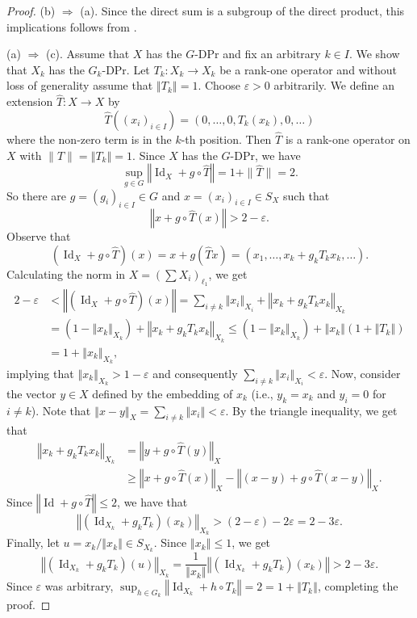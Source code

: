 \documentclass[a4paper,12pt]{amsart}
\theoremstyle{definition}
\theoremstyle{definition}
\theoremstyle{remark}
\numberwithin{equation}{section}
\DeclareMathOperator{\id}{Id}
\renewcommand{\geq}{\geqslant}
\renewcommand{\leq}{\leqslant}
\newcommand{\<}{\langle}
\renewcommand{\>}{\rangle}
\newcommand{\norm}[1]{\left\Vert#1\right\Vert}
\newcommand{\e}{\varepsilon}
\newcommand{\eps}{\e}
\begin{document}
	\begin{proof} (b) $\Rightarrow$ (a). Since the direct sum is a subgroup of the direct product, this implications follows from .  
		
		\noindent
		(a) $\Rightarrow$ (c). Assume that $X$ has the $G$-DPr and fix an arbitrary $k \in I$. We show that $X_k$ has the $G_k$-DPr. Let $T_k: X_k \to X_k$ be a rank-one operator and without loss of generality assume that $\norm{T_k} = 1$. Choose $\eps > 0$ arbitrarily. We define an extension $\hat{T}: X \to X$ by
		\[
		\hat{T}((x_i)_{i \in I}) = (0, \dots, 0, T_k(x_k), 0, \dots)
		\]
		where the non-zero term is in the $k$-th position. Then $\hat{T}$ is a rank-one operator on $X$ with $\|\hat{T}\| = \norm{T_k} = 1$. Since $X$ has the $G$-DPr, we have
		\[
		\sup_{g \in G} \norm{\id_X + g \circ \hat{T}} = 1 + \|\hat{T}\| = 2.
		\]
		So there are $g = (g_i)_{i \in I} \in G$ and $x = (x_i)_{i \in I} \in S_X$ such that
		\begin{equation*}
			\norm{x + g \circ \hat{T}(x)} > 2 - \eps.
		\end{equation*}
		Observe that
		\[
		(\id_X + g \circ \hat{T})(x) = x + g(\hat{T}x) = (x_1, \dots, x_k + g_k T_k x_k, \dots).
		\]
		Calculating the norm in $X = (\sum X_i)_{\ell_1}$, we get
		\begin{align*}
			2 - \eps
			&< \norm{(\id_X + g \circ \hat{T})(x)}
			= \sum_{i \neq k} \norm{x_i}_{X_i} + \norm{x_k + g_k T_k x_k}_{X_k}\\
			&= (1 - \norm{x_k}_{X_k}) + \norm{x_k + g_k T_k x_k}_{X_k}
			\leq (1 - \norm{x_k}_{X_k}) + \norm{x_k} (1 + \norm{T_k})\\
			&= 1 + \norm{x_k}_{X_k},
		\end{align*}
		implying that $\norm{x_k}_{X_k} > 1 - \eps$ and consequently $\sum_{i \neq k} \norm{x_i}_{X_i} < \eps$.
		Now, consider the vector $y \in X$ defined by the embedding of $x_k$ (i.e., $y_k = x_k$ and $y_i = 0$ for $i \neq k$). Note that $\norm{x - y}_X = \sum_{i \neq k} \norm{x_i} < \e$. By the triangle inequality, we get that
		\begin{align*}
			\norm{x_k + g_k T_k x_k}_{X_k}
			&= \norm{y + g \circ \hat{T}(y)}_X \\
			&\geq \norm{x + g \circ \hat{T}(x)}_X - \norm{(x - y) + g \circ \hat{T}(x - y)}_X.
		\end{align*}
		Since $\norm{\id + g \circ \hat{T}} \leq 2$, we have that
		\[
		\norm{(\id_{X_k} + g_k T_k)(x_k)}_{X_k} > (2 - \e) - 2\e = 2 - 3\e.
		\]
		Finally, let $u = x_k / \norm{x_k} \in S_{X_k}$. Since $\norm{x_k} \leq 1$, we get
		\[
		\norm{(\id_{X_k} + g_k T_k)(u)}_{X_k} = \frac{1}{\norm{x_k}} \norm{(\id_{X_k} + g_k T_k)(x_k)} > 2 - 3\e.
		\]
		Since $\e$ was arbitrary, $\sup_{h \in G_k} \norm{\id_{X_k} + h \circ T_k} = 2 = 1 + \norm{T_k}$, completing the proof.
		

\end{proof}
\end{document}
